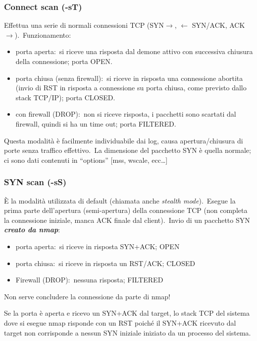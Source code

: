 \subsubsection{Connect scan (-sT)}

Effettua una serie di normali connessioni TCP (SYN$\rightarrow$, $\leftarrow$ SYN{\slash}ACK, ACK$\rightarrow$).\
Funzionamento:
\begin{itemize}
    \item porta aperta:\ si riceve una risposta dal demone attivo con successiva chiusura della connessione; porta OPEN.
    \item porta chiusa (senza firewall):\ si riceve in risposta una connessione abortita (invio di RST in risposta a connessione su porta chiusa, come previsto dallo stack TCP/IP); porta CLOSED.
    \item con firewall (DROP):\ non si riceve risposta, i pacchetti sono scartati dal firewall, quindi si ha un time out; porta FILTERED.
\end{itemize}
Questa modalità è facilmente individuabile dai log, causa apertura/chiusura di porte senza traffico effettivo.\
La dimensione del pacchetto SYN è quella normale; ci sono dati contenuti in ``options'' [mss, wscale, ecc\dots]

\subsubsection{SYN scan (-sS)}

È la modalità utilizzata di default (chiamata anche \emph{stealth mode}).\
Esegue la prima parte dell’apertura (semi-apertura) della connessione TCP (non completa la connessione iniziale, manca ACK finale dal client).\
Invio di un pacchetto SYN \textbf{\emph{creato da nmap}}:
\begin{itemize}
    \item porta aperta:\ si riceve in risposta SYN+ACK; OPEN
    \item porta chiusa:\ si riceve in risposta un RST/ACK; CLOSED
    \item Firewall (DROP):\ nessuna risposta; FILTERED
\end{itemize}
Non serve concludere la connessione da parte di nmap!

Se la porta è aperta e ricevo un SYN+ACK dal target, lo stack TCP del sistema dove si esegue nmap risponde con un RST poiché il SYN+ACK ricevuto dal target non corrisponde a nessun SYN iniziale iniziato da un processo del sistema.

